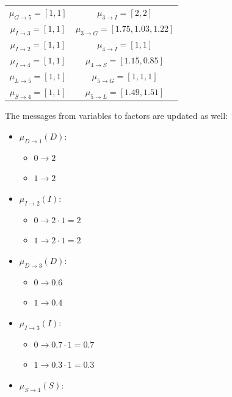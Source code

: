 \begin{example}
\begin{table}[H]
\begin{tabular}{cc}
        $\mu_{G \rightarrow 5}=[1,1]$ & $\mu_{3 \rightarrow I}=[2,2]$   \\
        $\mu_{I \rightarrow 3}=[1,1]$ & $\mu_{3 \rightarrow G}=[1.75,1.03,1.22]$ \\
        $\mu_{I \rightarrow 2}=[1,1]$ & $\mu_{4 \rightarrow I}=[1,1]$   \\
        $\mu_{I \rightarrow 4}=[1,1]$ & $\mu_{4 \rightarrow S}=[1.15,0.85]$   \\
        $\mu_{L \rightarrow 5}=[1,1]$ & $\mu_{5 \rightarrow G}=[1,1,1]$ \\
        $\mu_{S \rightarrow 4}=[1,1]$ & $\mu_{5 \rightarrow L}=[1.49,1.51]$   \\ \hline
        \end{tabular}
    \end{table}
    The messages from variables to factors are updated as well:
    \begin{itemize}
        \item $\mu_{D \rightarrow 1}(D)$:
            \begin{itemize}
                \item $0 \rightarrow 2$
                \item $1 \rightarrow 2$
            \end{itemize}
        \item $\mu_{I \rightarrow 2}(I)$:
            \begin{itemize}
                \item $0 \rightarrow 2 \cdot 1 = 2$
                \item $1 \rightarrow 2 \cdot 1 = 2$
            \end{itemize}
        \item $\mu_{D \rightarrow 3}(D)$:
            \begin{itemize}
                \item $0 \rightarrow 0.6$
                \item $1 \rightarrow 0.4$
            \end{itemize}
        \item $\mu_{I \rightarrow 3}(I)$:
            \begin{itemize}
                \item $0 \rightarrow 0.7 \cdot 1=0.7$
                \item $1 \rightarrow 0.3 \cdot 1=0.3$
            \end{itemize}
        \item $\mu_{S \rightarrow 4}(S)$: 

\end{itemize}
\end{example}
